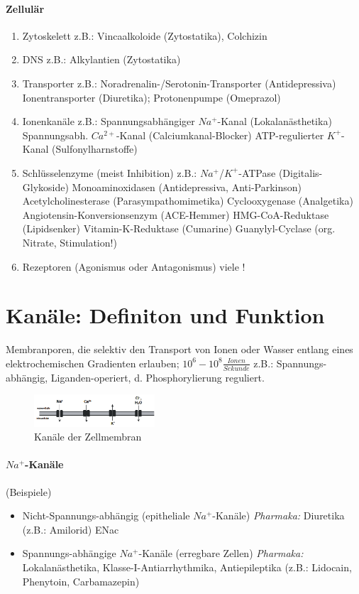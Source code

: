 \documentclass[10pt,a4paper]{report}
\begin{document}
\paragraph{Zellulär}
\begin{enumerate}
	\item Zytoskelett z.B.: Vincaalkoloide (Zytostatika), Colchizin 
	\item DNS z.B.: Alkylantien (Zytostatika)
	\item Transporter z.B.: 
Noradrenalin-/Serotonin-Transporter (Antidepressiva) Ionentransporter (Diuretika); Protonenpumpe (Omeprazol)
	\item Ionenkanäle z.B.: 
	Spannungsabhängiger $Na^+$-Kanal (Lokalanästhetika)
	Spannungsabh. $Ca^{2+}$-Kanal (Calciumkanal-Blocker)
	ATP-regulierter $K^+$-Kanal (Sulfonylharnstoffe)
	\item Schlüsselenzyme (meist Inhibition) z.B.:
		$Na^+$/$K^+$-ATPase (Digitalis-Glykoside)
		Monoaminoxidasen (Antidepressiva, Anti-Parkinson)
		Acetylcholinesterase (Parasympathomimetika)		
		Cyclooxygenase (Analgetika)
		Angiotensin-Konversionsenzym (ACE-Hemmer)
		HMG-CoA-Reduktase (Lipidsenker)
		Vitamin-K-Reduktase (Cumarine)
		Guanylyl-Cyclase (org. Nitrate, Stimulation!)
	\item Rezeptoren (Agonismus oder Antagonismus)	viele !
\end{enumerate}
\section{Kanäle: Definiton und Funktion}
Membranporen, die selektiv den Transport von Ionen oder Wasser entlang eines elektrochemischen Gradienten erlauben; $10^6-10^8\frac{Ionen}{Sekunde}$
z.B.: Spannungs-abhängig, Liganden-operiert, d. Phosphorylierung reguliert.
\begin{figure}[h]
	\centering 
	\includegraphics[width=0.4\textwidth]{kanaele.png} 
	\caption{Kanäle der Zellmembran} 
	\label{fig:Kanaele}
\end{figure}
\paragraph{$Na^+$-Kanäle} (Beispiele)\\
\begin{itemize}
	\item Nicht-Spannungs-abhängig (epitheliale $Na^+$-Kanäle) \textit{Pharmaka:}  Diuretika (z.B.: Amilorid) ENac		                           
	\item Spannungs-abhängige $Na^+$-Kanäle (erregbare Zellen)
		\textit{Pharmaka: } Lokalanästhetika, Klasse-I-Antiarrhythmika, Antiepileptika (z.B.: Lidocain, Phenytoin, Carbamazepin)
\end{itemize}
\end{document}

